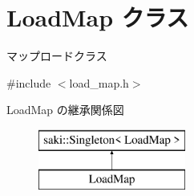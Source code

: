 \hypertarget{class_load_map}{}\section{Load\+Map クラス}
\label{class_load_map}


マップロードクラス  




{\ttfamily \#include $<$load\+\_\+map.\+h$>$}

Load\+Map の継承関係図\begin{figure}[H]
\begin{center}
\leavevmode
\includegraphics[height=2.000000cm]{class_load_map}
\end{center}
\end{figure}
